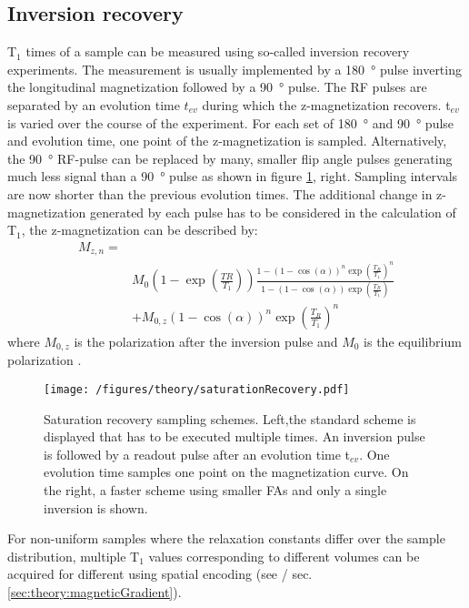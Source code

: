         \subsection{Inversion recovery}
        T$_1$ times of a sample can be measured using so-called inversion recovery experiments. The measurement is usually implemented by a \SI{180}{\degree} pulse inverting the longitudinal magnetization followed by a \SI{90}{\degree} pulse. The RF pulses are separated by an evolution time $t_{ev}$ during which the z-magnetization recovers. t$_{ev}$ is varied over the course of the experiment. For each set of \SI{180}{\degree} and \SI{90}{\degree} pulse and evolution time, one point of the z-magnetization is sampled. Alternatively, the \SI{90}{\degree} RF-pulse can be replaced by many, smaller flip angle pulses generating much less signal than a \SI{90}{\degree} pulse as shown in figure \ref{figure:theory:inversionRecovery}, right. Sampling intervals are now shorter than the previous evolution times. The additional change in z-magnetization generated by each pulse has to be considered in the calculation of T$_1$, the z-magnetization can be described by:
        \begin{equation}
            \begin{split}
                M_{z,n} =& \\ &M_0 \left(1-\exp{\left(\frac{TR}{T_1}\right)}\right)\frac{1-(1-\cos(\alpha))^n\exp\left(\frac{T_R}{T_1}\right)^n}{1-(1-\cos(\alpha))\exp\left(\frac{T_R}{T_1}\right)}\\ 
                         &+M_{0,z}(1-\cos(\alpha))^n\exp\left(\frac{T_R}{T_1}\right)^n
            \end{split}
        \end{equation}
        where $M_{0,z}$ is the polarization after the inversion pulse and $M_0$ is the equilibrium polarization \cite{look_time_1970-1, drobnitzky_closed-form_2017}.
            \begin{figure}
                \centering
                \texttt{[image: /figures/theory/saturationRecovery.pdf]}
                \caption[Saturation recovery]{Saturation recovery sampling schemes. Left,the standard scheme is displayed that has to be executed multiple times. An inversion pulse is followed by a readout pulse after an evolution time t$_{ev}$. One evolution time samples one point on the magnetization curve. On the right, a faster scheme using smaller FAs and only a single inversion is shown.}
                \label{figure:theory:inversionRecovery}
            \end{figure}
            For non-uniform samples where the relaxation constants differ over the sample distribution, multiple T$_1$ values corresponding to different volumes can be acquired for different using spatial encoding (see \cite{scheffler_t1_2001} / sec. \ref{sec:theory:magneticGradient}).

